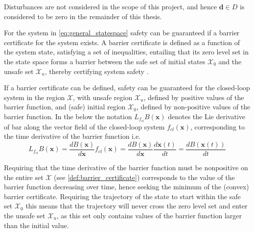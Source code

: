 Disturbances are not considered in the scope of this project, and hence $\mathbf{d}\in D$ is considered to be zero in the remainder of this thesis.

For the system in \autoref{eq:general_statespace} safety can be guaranteed if a barrier certificate for the system exists. A barrier certificate is defined as a function of the system state, satisfying a set of inequalities, entailing that its zero level set in the state space forms a barrier between the safe set of initial states $\mathcal{X}_0$ and the unsafe set $\mathcal{X}_u$, thereby certifying system safety \citep{bib:prajna_framework}.


If a barrier certificate can be defined, safety can be guaranteed for the closed-loop system in the region $\mathcal{X}$, with unsafe region $\mathcal{X}_u$, defined by positive values of the barrier function, and (safe) initial region $\mathcal{X}_0$, defined by non-positive values of the barrier function. In the below the notation $L_{f_{cl}}B(\mathbf{x})$ denotes the Lie derivative of \gls{bar} along the vector field of the closed-loop system $f_{cl}(\mathbf{x})$, corresponding to the time derivative of the barrier function i.e.
\begin{equation}
L_{f_{cl}}B(\mathbf{x})=\frac{dB(\mathbf{x})}{d\mathbf{x}}f_{cl}(\mathbf{x})=\frac{dB(\mathbf{x})}{d\mathbf{x}}\frac{d\mathbf{x}(t)}{dt}=\frac{dB(\mathbf{x}(t))}{dt}
\end{equation}

Requiring that the time derivative of the barrier function must be nonpositive on the entire set $\mathcal{X}$ (see \autoref{def:barrier_certificate}) corresponds to the value of the barrier function decreasing over time, hence seeking the minimum of the (convex) barrier certificate. Requiring the trajectory of the state to start within the safe set $\mathcal{X}_0$ this means that the trajectory will never cross the zero level set and enter the unsafe set $\mathcal{X}_u$, as this set only contains values of the barrier function larger than the initial value.

